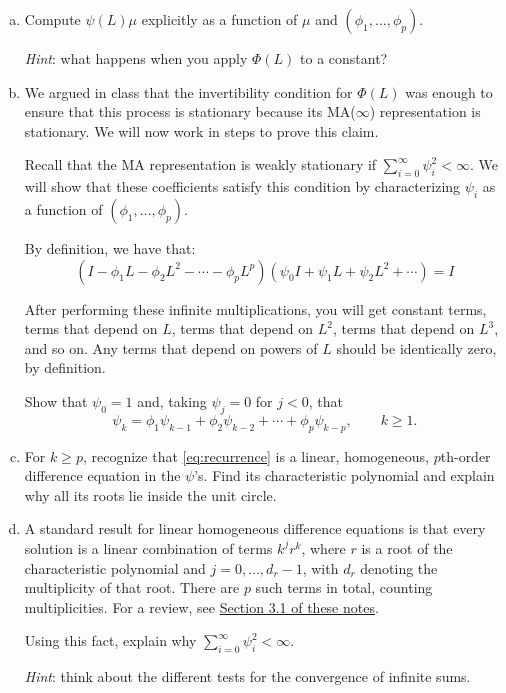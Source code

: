 \documentclass[11pt]{article}
\theoremstyle{definition}
\begin{document}
\begin{enumerate}[a)]
	\item Compute $\psi(L)\mu$ explicitly as a function of $\mu$ and $(\phi_1, \dots, \phi_p)$.

	\textit{Hint}: what happens when you apply $\Phi(L)$ to a constant?

	\item We argued in class that the invertibility condition for $\Phi(L)$ was enough to ensure that this process is stationary because its MA($\infty$) representation is stationary. We will now work in steps to prove this claim.

		Recall that the MA representation is weakly stationary if $\sum\limits_{i=0}^{\infty}\psi_i^2 < \infty$. We will show that these coefficients satisfy this condition by characterizing $\psi_i$ as a function of $(\phi_1, \dots, \phi_p)$.

	By definition, we have that:
	\begin{equation*}
			(I - \phi_1 L - \phi_2 L^2 - \cdots - \phi_p L^p)(\psi_0 I + \psi_1 L + \psi_2 L^2 + \cdots) = I
	\end{equation*}

	After performing these infinite multiplications, you will get constant terms, terms that depend on $L$, terms that depend on $L^2$, terms that depend on $L^3$, and so on. Any terms that depend on powers of $L$ should be identically zero, by definition.

		Show that $\psi_0 = 1$ and, taking $\psi_j = 0$ for $j < 0$, that
	\begin{equation}
		\label{eq:recurrence}
			\psi_k = \phi_1 \psi_{k-1} + \phi_2 \psi_{k-2} + \cdots + \phi_p \psi_{k-p}, \qquad k \geq 1.
	\end{equation}

	\item For $k \geq p$, recognize that \eqref{eq:recurrence} is a linear, homogeneous, $p$th-order difference equation in the $\psi$'s. Find its characteristic polynomial and explain why all its roots lie inside the unit circle.

	\item A standard result for linear homogeneous difference equations is that every solution is a linear combination of terms $k^j r^k$, where $r$ is a root of the characteristic polynomial and $j = 0, \dots, d_r-1$, with $d_r$ denoting the multiplicity of that root. There are $p$ such terms in total, counting multiplicities. For a review, see \href{https://wwz.unibas.ch/fileadmin/user_upload/wwz/00_Professuren/Kleiber_Oekonometrie_und_Statistik/Downloads/Topics/Skript008_DifferenceEquations.pdf}{Section 3.1 of these notes}.

	Using this fact, explain why $\sum\limits_{i=0}^{\infty}\psi_i^2 < \infty$.

	\emph{Hint}: think about the different tests for the convergence of infinite sums.
\end{enumerate}
\end{document}
